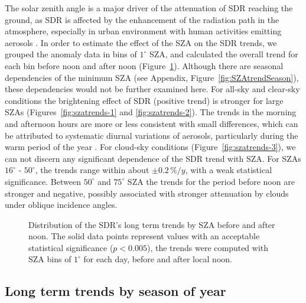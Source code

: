 \documentclass[applsci,article,submit,moreauthors,pdftex]{Definitions/mdpi}
\begin{document}
The solar zenith angle is a major driver of the attenuation of SDR
reaching the ground, as SDR is affected by the enhancement of the
radiation path in the atmosphere, especially in urban environment with
human activities emitting aerosols \citep{Wang2021}. In order to
estimate the effect of the SZA on the SDR trends, we grouped the anomaly
data in bins of \(1^\circ\) SZA, and calculated the overall trend for
each bin before noon and after noon (Figure~\ref{fig:szatrends}).
Although there are seasonal dependencies of the minimum SZA (see
Appendix, Figure~\ref{fig:SZAtrendSeason}), these dependencies would not
be further examined here. For all-sky and clear-sky conditions the
brightening effect of SDR (positive trend) is stronger for large SZAs
(Figures~\ref{fig:szatrends-1} and \ref{fig:szatrends-2}). The trends in
the morning and afternoon hours are more or less consistent with small
differences, which can be attributed to systematic diurnal variations of
aerosols, particularly during the warm period of the year
\citep{Wang2021}. For cloud-sky conditions
(Figure~\ref{fig:szatrends-3}), we can not discern any significant
dependence of the SDR trend with SZA. For SZAs \(16^\circ\) -
\(50^\circ\), the trends range within about \(\pm 0.2\,\%/y\), with a
weak statistical significance. Between \(50^\circ\) and \(75^\circ\) SZA
the trends for the period before noon are stronger and negative,
possibly associated with stronger attenuation by clouds under oblique
incidence angles.

\begin{figure}[h!]

{\centering {}

}

\caption{Distribution of the SDR's long term trends by SZA before and after noon. The solid data points represent values with an acceptable statistical significance ($p<0.005$), the trends were computed with SZA bins of $1^\circ$ for each day, before and after local noon.}\label{fig:szatrends}
\end{figure}

\hypertarget{long-term-trends-by-season-of-year}{%
\subsection{Long term trends by season of
year}\label{long-term-trends-by-season-of-year}}
\end{document}
